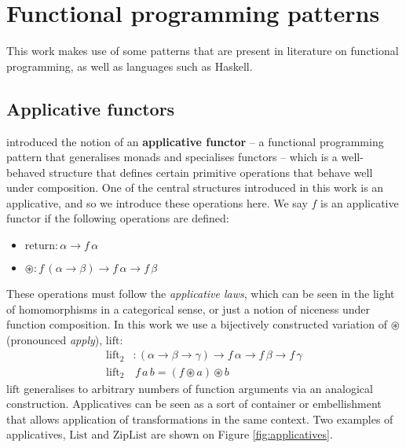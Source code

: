 \section{Functional programming patterns}

This work makes use of some patterns that are present in literature on functional programming, as well as languages such as Haskell.

\subsection{Applicative functors}

\textcite{mcbride2008applicative} introduced the notion of an \textbf{applicative functor} -- a functional programming pattern that generalises monads and specialises functors -- which is a well-behaved structure that defines certain primitive operations that behave well under composition. One of the central structures introduced in this work is an applicative, and so we introduce these operations here. We say $f$ is an applicative functor if the following operations are defined:
\begin{itemize}
    \item $\mathrm{return} : \alpha \to f\,\alpha$
    \item $\circledast : f\,(\alpha \to \beta) \to f\,\alpha \to f\,\beta $
\end{itemize}
These operations must follow the \textit{applicative laws}, which can be seen in the light of homomorphisms in a categorical sense, or just a notion of niceness under function composition. In this work we use a bijectively constructed variation of $\circledast$ (pronounced \textit{apply}), $\mathrm{lift}$:
\begin{align*}
\mathrm{lift}_2& : (\alpha \to \beta \to \gamma) \to f\,\alpha \to f\,\beta \to f\,\gamma \\ 
\mathrm{lift}_2&\,f\,a\,b = (f \circledast a) \circledast b
\end{align*}
$\mathrm{lift}$ generalises to arbitrary numbers of function arguments via an analogical construction. Applicatives can be seen as a sort of container or embellishment that allows application of transformations in the same context. Two examples of applicatives, $\mathrm{List}$ and $\mathrm{ZipList}$ are shown on Figure \ref{fig:applicatives}.
%
